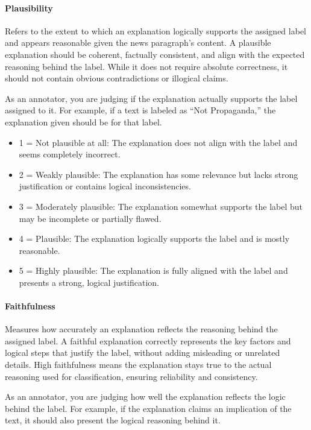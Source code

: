\paragraph{Plausibility}
Refers to the extent to which an explanation logically supports the assigned label and appears reasonable given the news paragraph's content. A plausible explanation should be coherent, factually consistent, and align with the expected reasoning behind the label. While it does not require absolute correctness, it should not contain obvious contradictions or illogical claims.

As an annotator, you are judging if the explanation actually supports the label assigned to it. For example, if a text is labeled as ``Not Propaganda,'' the explanation given should be for that label.

\begin{itemize}[noitemsep,topsep=0pt,labelsep=.5em]
    \item 1 = Not plausible at all: The explanation does not align with the label and seems completely incorrect.
    \item 2 = Weakly plausible: The explanation has some relevance but lacks strong justification or contains logical inconsistencies.
    \item 3 = Moderately plausible: The explanation somewhat supports the label but may be incomplete or partially flawed.
    \item 4 = Plausible: The explanation logically supports the label and is mostly reasonable.
    \item 5 = Highly plausible: The explanation is fully aligned with the label and presents a strong, logical justification.
\end{itemize}

\paragraph{Faithfulness}
Measures how accurately an explanation reflects the reasoning behind the assigned label. A faithful explanation correctly represents the key factors and logical steps that justify the label, without adding misleading or unrelated details. High faithfulness means the explanation stays true to the actual reasoning used for classification, ensuring reliability and consistency.

As an annotator, you are judging how well the explanation reflects the logic behind the label. For example, if the explanation claims an implication of the text, it should also present the logical reasoning behind it.

